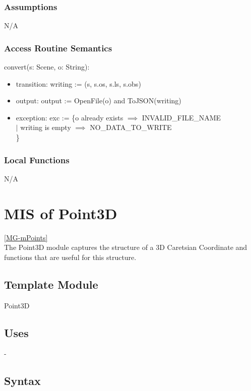 \documentclass[12pt, titlepage]{article}
\begin{document}
\subsubsection{Assumptions}
N/A

\subsubsection{Access Routine Semantics}
\noindent convert(s: Scene, o: String):
\begin{itemize}
	\item transition: writing := (s, s.os, s.ls, s.obs)
	\item output: output := OpenFile(o) and ToJSON(writing)
	\item exception: exc := \{o already exists $\implies$ INVALID\_FILE\_NAME\\
	$|$ writing is empty $\implies$ NO\_DATA\_TO\_WRITE \\
	\}
\end{itemize}

\subsubsection{Local Functions}
N/A

\newpage

\section{MIS of Point3D} \ref{MG-mPoints} \\
The Point3D module captures the structure of a 3D Caretsian Coordinate and 
functions that are useful for this structure.

\subsection{Template Module}
Point3D

\subsection{Uses} -

\subsection{Syntax}
\end{document}
